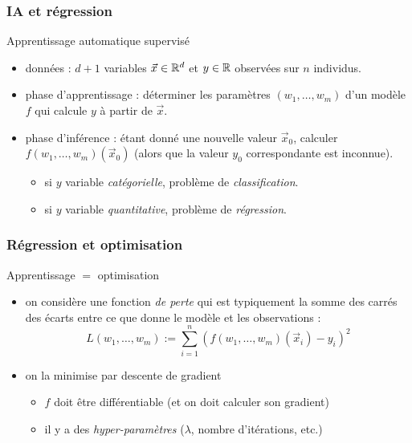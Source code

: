 \documentclass{beamer}
\newcommand{\R}{{\ensuremath\mathbb{R}}}
\begin{document}
\begin{frame}
  \frametitle{IA et régression}

  \begin{block}{Apprentissage automatique supervisé}

    \begin{itemize}
      \item données : $d+1$ variables $\vec{x} \in \R^d$ et $y \in \R$ observées sur $n$ individus. 
      \item phase d'apprentissage : déterminer les paramètres $(w_1, \dots, w_m)$ d'un modèle $f$
        qui calcule $y$ à partir de $\vec{x}$.
      \item phase d'inférence : étant donné une nouvelle valeur $\vec{x}_0$,
        calculer $f(w_1, \dots, w_m)(\vec{x}_0)$
        (alors que la valeur $y_0$ correspondante est inconnue). 
        \begin{itemize}
        \item si $y$ variable \emph{catégorielle}, problème de \emph{classification}. 
        \item si $y$ variable \emph{quantitative}, problème de \emph{régression}. 
        \end{itemize}
    \end{itemize}
  \end{block}

\end{frame}

\begin{frame}
  \frametitle{Régression et optimisation}

  \begin{block}{Apprentissage $=$ optimisation}

    \begin{itemize}
    \item on considère une fonction \emph{de perte} qui
      est typiquement la somme des carrés des écarts entre ce que
      donne le modèle et les observations :
      \[ L(w_1, \dots, w_m) :=
      \sum_{i=1}^n (f(w_1, \dots, w_m)(\vec{x}_i) - y_i)^2 \]
    \item on la minimise par descente de gradient
      \begin{itemize}
      \item $f$ doit être différentiable (et on doit calculer son gradient)
      \item il y a des \emph{hyper-paramètres} ($\lambda$, nombre d'itérations, etc.)
      \end{itemize}
    \end{itemize}

  \end{block}
  
\end{frame}
\end{document}

